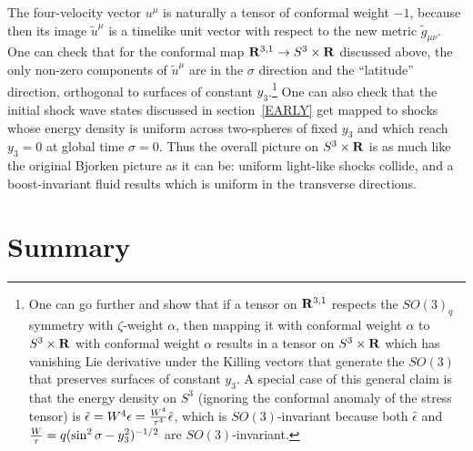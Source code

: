 \documentclass[12pt]{article}
\begin{document}
The four-velocity vector $u^\mu$ is naturally a tensor of conformal weight $-1$, because then its image $\tilde{u}^\mu$ is a timelike unit vector with respect to the new metric $\tilde{g}_{\mu\nu}$.  One can check that for the conformal map ${\bf R}^{3,1} \to S^3 \times {\bf R}$ discussed above, the only non-zero components of $\tilde{u}^\mu$ are in the $\sigma$ direction and the ``latitude'' direction, orthogonal to surfaces of constant $y_3$.\footnote{One can go further and show that if a tensor on ${\bf R}^{3,1}$ respects the $SO(3)_q$ symmetry with $\zeta$-weight $\alpha$, then mapping it with conformal weight $\alpha$ to $S^3 \times {\bf R}$ with conformal weight $\alpha$ results in a tensor on $S^3 \times {\bf R}$ which has vanishing Lie derivative under the Killing vectors that generate the $SO(3)$ that preserves surfaces of constant $y_3$.  A special case of this general claim is that the energy density on $S^3$ (ignoring the conformal anomaly of the stress tensor) is $\tilde\epsilon = W^4 \epsilon = {W^4 \over \tau^4} \hat\epsilon$, which is $SO(3)$-invariant because both $\hat\epsilon$ and ${W \over \tau} = q (\sin^2 \sigma - y_3^2)^{-1/2}$ are $SO(3)$-invariant.}  One can also check that the initial shock wave states discussed in section~\ref{EARLY} get mapped to shocks whose energy density is uniform across two-spheres of fixed $y_3$ and which reach $y_3=0$ at global time $\sigma = 0$.  Thus the overall picture on $S^3 \times {\bf R}$ is as much like the original Bjorken picture as it can be: uniform light-like shocks collide, and a boost-invariant fluid results which is uniform in the transverse directions.



\section{Summary}
\label{SUMMARY}
\end{document}
